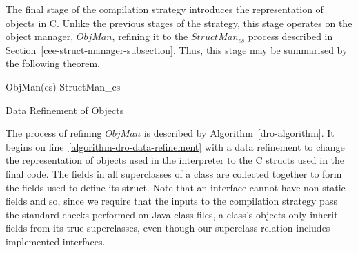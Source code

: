 The final stage of the compilation strategy introduces the
representation of objects in C.
Unlike the previous stages of the strategy, this stage operates on the
object manager, $ObjMan$, refining it to the $StructMan_{cs}$ process
described in Section~\ref{cee-struct-manager-subsection}.
Thus, this stage may be summarised by the following theorem.
\begin{thm}\label{dro-thm}
  \begin{circus}
    ObjMan(cs) \circrefines StructMan_{cs}
  \end{circus}
\end{thm}

\begin{algorithm}[b]
  \begin{algorithmic}[1]
    \State {}
    \label{algorithm-dro-data-refinement}
    \State {}
    \label{algorithm-dro-refine-NewObject}
    \State {}
    \State {}
    \State {}
    \State {}
    \label{algorithm-dro-refine-PutStatic}
    \State {}
    \label{algorithm-dro-cs-elimination}
  \end{algorithmic}
  \caption{Data Refinement of Objects}
  \label{dro-algorithm}
\end{algorithm}

The process of refining $ObjMan$ is described by
Algorithm~\ref{dro-algorithm}. 
It begins on line~\ref{algorithm-dro-data-refinement} with a data
refinement to change the representation of objects used in the
interpreter to the C structs used in the final code.
The fields in all superclasses of a class are collected together to
form the fields used to define its struct.
Note that an interface cannot have non-static fields and so, since we
require that the inputs to the compilation strategy pass the standard
checks performed on Java class files, a class's objects only inherit
fields from its true superclasses, even though our superclass relation
includes implemented interfaces.


